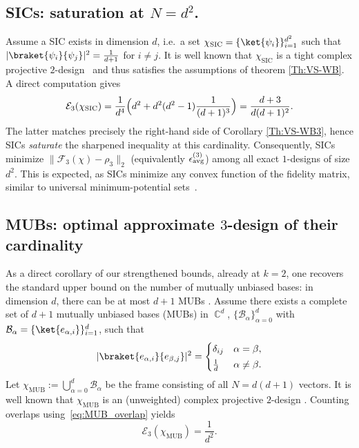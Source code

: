 \documentclass[aps,twocolumn,pra,superscriptaddress,nofootinbib]{revtex4-2}
\DeclareMathOperator{\C}{\mathbb{C}} %
\begin{document}
\subsection{SICs: saturation at $N=d^2$.}
Assume a SIC exists in dimension $d$, i.e.\ a set
$\chi_{\mathrm{SIC}}=\{\ket{\psi_i}\}_{i=1}^{d^2}$ such that
$|\braket{\psi_i}{\psi_j}|^2=\frac{1}{d+1}$ for $i\neq j$.
It is well known that $\chi_{\mathrm{SIC}}$ is a tight complex projective $2$-design~\cite{Renes2004} and thus satisfies the assumptions of theorem \ref{Th:VS-WB}.
A direct computation gives
\begin{equation}\label{eq:E3_SIC}
\mathcal{E}_3(\chi_{\mathrm{SIC}})
= \frac{1}{d^4}\Bigl(d^2 + d^2(d^2-1)\frac{1}{(d+1)^3}\Bigr)
= \frac{d+3}{d(d+1)^2}.
\end{equation}
{The latter matches precisely the right-hand side of Corollary \ref{Th:VS-WB3}}, hence SICs
\emph{saturate} the sharpened inequality at this cardinality. Consequently, SICs minimize
$\|\mathcal F_3(\chi)-\rho_3\|_2$ (equivalently $\epsilon^{(3)}_{\rm avg}$) among all exact {$1$-designs} of size $d^2$.
This is expected, as SICs minimize any convex function of the fidelity matrix, similar to universal minimum-potential sets~\cite{UniversalMinimizSets(2007)}.

\subsection{MUBs: optimal approximate $3$-design of their cardinality}
As a direct corollary of our strengthened bounds{,} already at $k=2$, one recovers the standard upper bound
on the number of mutually unbiased bases: in dimension $d$, there can be at most $d+1$ MUBs \cite{woottersMUB}.
Assume there exists a complete set of $d+1$ mutually unbiased bases (MUBs) in $\C^d$,
$\{\mathcal{B}_\alpha\}_{\alpha=0}^{d}$ with $\mathcal{B}_\alpha=\{\ket{e_{\alpha,i}}\}_{i=1}^d$, such that
\begin{equation}\label{eq:MUB_overlap}
|\braket{e_{\alpha,i}}{e_{\beta,j}}|^2 =
\begin{cases}
\delta_{ij} & \alpha=\beta,\\[2pt]
\frac{1}{d} & \alpha\neq\beta.
\end{cases}
\end{equation}
Let $\chi_{\mathrm{MUB}}:=\bigcup_{\alpha=0}^{d}\mathcal{B}_\alpha$ be the frame consisting of all
$N=d(d+1)$ vectors. It is well known that $\chi_{\mathrm{MUB}}$ is an (unweighted) complex projective $2$-design
\cite{klappenecker2005}. Counting overlaps using~\eqref{eq:MUB_overlap} yields
\begin{equation}\label{eq:E3_MUB}
\mathcal{E}_3(\chi_{\mathrm{MUB}})=\frac{1}{d^2}.
\end{equation}
\end{document}
